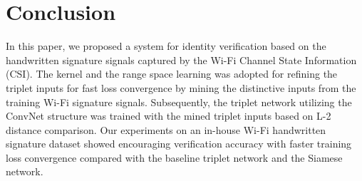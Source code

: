 \documentclass[sigconf]{acmart}
\begin{document}
\section{Conclusion}
In this paper, we proposed a system for identity verification based on the handwritten signature signals captured by the Wi-Fi Channel State Information (CSI).
The kernel and the range space learning was adopted for refining the triplet inputs for fast loss convergence by mining the distinctive inputs from the training Wi-Fi signature signals. 
Subsequently, the triplet network utilizing the ConvNet structure was trained with the mined triplet inputs based on L-2 distance comparison. 
Our experiments on an in-house Wi-Fi handwritten signature dataset showed encouraging verification accuracy with faster training loss convergence compared with the baseline triplet network and the Siamese network.


%
\end{document}
